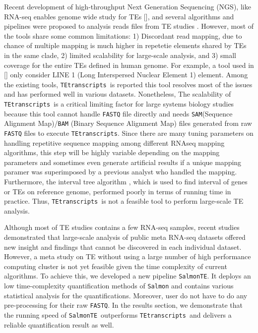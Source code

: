 \documentclass{ws-procs11x85}
\newcommand{\TEtranscripts}{\texttt{TEtranscripts}}
\newcommand{\SalmonTE}{\texttt{SalmonTE}}
\begin{document}
Recent development of high-throughput Next Generation Sequencing (NGS), like RNA-seq
enables genome wide study for TEs [], and several algorithms and pipelines were proposed to analysis reads files from TE studies \cite{lee2012landscape,platzer2012te,helman2014somatic,henaff2015jitterbug,jin2015tetranscripts,de2017identifying,tang2017human}. However, most of the tools share some common limitations: 1) Discordant read mapping, due to chance of multiple mapping is much higher in repetetie elements shared by TEs in the same clade, 2) limited scalability for large-scale analysis, and 3) small coverage for the entire TEs defined in human genome. For example, a tool used in [] only consider LINE 1 (Long Interspersed Nuclear Element 1) element.
\cite{ewing2015transposable} 
Among the existing tools, \TEtranscripts~is reported this tool resolves most of the issues and has performed well in various datasets.
\cite{jin2015tetranscripts}
Nonetheless, The scalability of \TEtranscripts~is a critical limiting factor for large systems biology studies because this tool cannot handle \verb|FASTQ| file directly and needs \verb|SAM|(Sequence Alignment Map)/\verb|BAM| (Binary Sequence Alignment Map) files generated from raw \verb|FASTQ| files to execute \TEtranscripts. Since there are many tuning parameters on handling repetitive sequence mapping among different RNAseq mapping algorithms, this step will be highly variable depending on the mapping parameters and sometimes even generate artificial results if a unique mapping paramer was superimposed by a previous analyst who handled the mapping. 
Furthermore, the interval tree algorithm \cite{samet1990design}, which is used to find interval of genes or TEs on reference genome,  performed poorly in terms of running time in practice. Thus, \TEtranscripts~is not a feasible tool to perform large-scale TE analysis.

Although most of TE studies contains a few RNA-seq samples, recent studies demonstrated that large-scale analysis of public meta RNA-seq datasets offered new insight and
findings that cannot be discovered in each individual dataset. \cite{nellore2016human} However, a meta study on TE without using a large number of high performance computing cluster is not yet feasible given the time complexity of current algorithms.  To achieve this, we developed a new pipeline \SalmonTE. It deploys an low time-complexity quantification methods of \verb|Salmon|\cite{patro2017salmon} and contains various statistical analysis for the quantifications. Moreover, user do not have to do any pre-processing for their raw \verb|FASTQ|. 
In the results section, we demonstrate that the running speed of  \SalmonTE~outperforms \TEtranscripts~and delivers a reliable quantification result as well.
\end{document}
